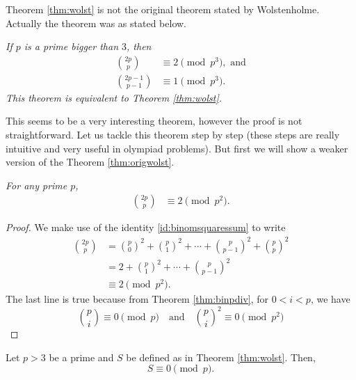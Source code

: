 \documentclass[12pt]{subfile}
\begin{document}
		\begin{remark}
			Theorem \eqref{thm:wolst} is not the original theorem stated by Wolstenholme. Actually the theorem was as stated below.
		\end{remark}
	
		\begin{theorem}\slshape\label{thm:origwolst}
			If $p$ is a prime bigger than $3$, then
			\begin{align*}
				\binom{2p}{p} & \equiv2\pmod{p^3}, \text{ and}\\
				\binom{2p-1}{p-1} & \equiv 1 \pmod{p^3}.
			\end{align*}
			This theorem is equivalent to Theorem \ref{thm:wolst}.
		\end{theorem}
	This seems to be a very interesting theorem, however the proof is not straightforward. Let us tackle this theorem step by step (these steps are really intuitive and very useful in olympiad problems). But first we will show a weaker version of the Theorem \ref{thm:origwolst}.
		\begin{theorem}\slshape
			For any prime $p$, 
				\begin{align*}
					\binom{2p}{p} & \equiv2\pmod{p^2}.
				\end{align*}
		\end{theorem}
		
		\begin{proof}
			We make use of the identity \eqref{id:binomsquaressum} to write
				\begin{align*}
					\binom{2p}p & = \binom{p}0^2+\binom{p}{1}^2+\cdots+\binom{p}{p-1}^2+\binom{p}{p}^2\\
								& = 2+\binom{p}{1}^2+\cdots+\binom{p}{p-1}^2\\
								& \equiv2\pmod{p^2}.
				\end{align*}
			The last line is true because from Theorem \ref{thm:binpdiv}, for $0<i<p$, we have
				\begin{equation*}
					\binom{p}{i}  \equiv 0\pmod p \quad \text{and} \quad \binom{p}{i}^2 \equiv 0\pmod{p^2}
				\end{equation*}
		\end{proof}
	
		\begin{lemma}\label{lem:wolstproof1}
			Let $p>3$ be a prime and $S$ be defined as in Theorem \ref{thm:wolst}. Then, $$S \equiv 0 \pmod p.$$
		\end{lemma}
		
\end{document}
